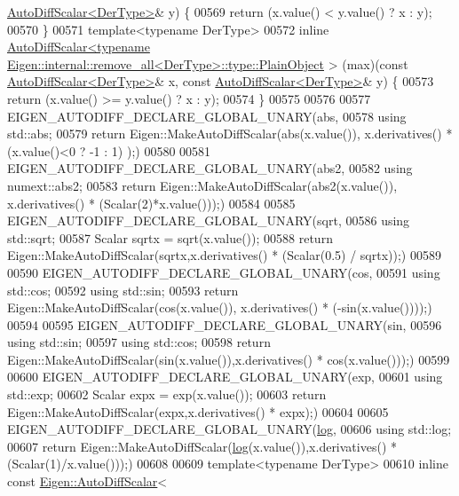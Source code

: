 \begin{DoxyCode}
      \hyperlink{class_eigen_1_1_auto_diff_scalar}{AutoDiffScalar<DerType>}& y) \{
00569   \textcolor{keywordflow}{return} (x.value() < y.value() ? x : y);
00570 \}
00571 \textcolor{keyword}{template}<\textcolor{keyword}{typename} DerType>
00572 \textcolor{keyword}{inline} 
      \hyperlink{class_eigen_1_1_auto_diff_scalar}{AutoDiffScalar<typename Eigen::internal::remove\_all<DerType>::type::PlainObject}
      > (max)(\textcolor{keyword}{const} \hyperlink{class_eigen_1_1_auto_diff_scalar}{AutoDiffScalar<DerType>}& x, \textcolor{keyword}{const} 
      \hyperlink{class_eigen_1_1_auto_diff_scalar}{AutoDiffScalar<DerType>}& y) \{
00573   \textcolor{keywordflow}{return} (x.value() >= y.value() ? x : y);
00574 \}
00575 
00576 
00577 EIGEN\_AUTODIFF\_DECLARE\_GLOBAL\_UNARY(abs,
00578   \textcolor{keyword}{using} std::abs;
00579   \textcolor{keywordflow}{return} Eigen::MakeAutoDiffScalar(abs(x.value()), x.derivatives() * (x.value()<0 ? -1 : 1) );)
00580 
00581 EIGEN\_AUTODIFF\_DECLARE\_GLOBAL\_UNARY(abs2,
00582   \textcolor{keyword}{using} numext::abs2;
00583   \textcolor{keywordflow}{return} Eigen::MakeAutoDiffScalar(abs2(x.value()), x.derivatives() * (Scalar(2)*x.value()));)
00584 
00585 EIGEN\_AUTODIFF\_DECLARE\_GLOBAL\_UNARY(sqrt,
00586   \textcolor{keyword}{using} std::sqrt;
00587   Scalar sqrtx = sqrt(x.value());
00588   \textcolor{keywordflow}{return} Eigen::MakeAutoDiffScalar(sqrtx,x.derivatives() * (Scalar(0.5) / sqrtx));)
00589 
00590 EIGEN\_AUTODIFF\_DECLARE\_GLOBAL\_UNARY(cos,
00591   \textcolor{keyword}{using} std::cos;
00592   \textcolor{keyword}{using} std::sin;
00593   \textcolor{keywordflow}{return} Eigen::MakeAutoDiffScalar(cos(x.value()), x.derivatives() * (-sin(x.value())));)
00594 
00595 EIGEN\_AUTODIFF\_DECLARE\_GLOBAL\_UNARY(sin,
00596   \textcolor{keyword}{using} std::sin;
00597   \textcolor{keyword}{using} std::cos;
00598   \textcolor{keywordflow}{return} Eigen::MakeAutoDiffScalar(sin(x.value()),x.derivatives() * cos(x.value()));)
00599 
00600 EIGEN\_AUTODIFF\_DECLARE\_GLOBAL\_UNARY(exp,
00601   \textcolor{keyword}{using} std::exp;
00602   Scalar expx = exp(x.value());
00603   \textcolor{keywordflow}{return} Eigen::MakeAutoDiffScalar(expx,x.derivatives() * expx);)
00604 
00605 EIGEN\_AUTODIFF\_DECLARE\_GLOBAL\_UNARY(\hyperlink{structlog}{log},
00606   \textcolor{keyword}{using} std::log;
00607   \textcolor{keywordflow}{return} Eigen::MakeAutoDiffScalar(\hyperlink{structlog}{log}(x.value()),x.derivatives() * (Scalar(1)/x.value()));)
00608 
00609 template<typename DerType>
00610 \textcolor{keyword}{inline} \textcolor{keyword}{const} \hyperlink{class_eigen_1_1_auto_diff_scalar}{Eigen::AutoDiffScalar}<

\end{DoxyCode}
